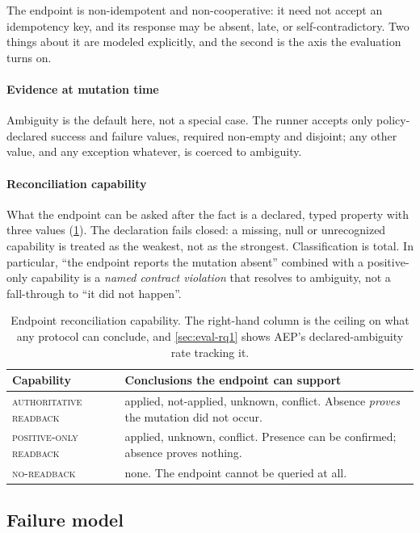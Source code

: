 The endpoint is non-idempotent and non-cooperative: it need not accept an
idempotency key, and its response may be absent, late, or self-contradictory.
Two things about it are modeled explicitly, and the second is the axis the
evaluation turns on.

\paragraph{Evidence at mutation time} Ambiguity is the default here, not a
special case. The runner accepts only policy-declared
success and failure values, required non-empty and disjoint; any other value,
and any exception whatever, is coerced to ambiguity.

\paragraph{Reconciliation capability} What the endpoint can be asked after the
fact is a declared, typed property with three values
(\cref{tab:capabilities}). The declaration fails closed: a missing, null or
unrecognized capability is treated as the weakest, not as the strongest.
Classification is total. In particular, ``the endpoint reports the mutation
absent'' combined with a positive-only capability is a \emph{named contract
violation} that resolves to ambiguity, not a fall-through to ``it did not
happen''.

\begin{table}[t]
\centering
\caption{Endpoint reconciliation capability. The right-hand column is the
ceiling on what any protocol can conclude, and \cref{sec:eval-rq1} shows
AEP's declared-ambiguity rate tracking it.}
\label{tab:capabilities}
\small
\begin{tabular}{@{}p{}p{}@{}}
\toprule
Capability & Conclusions the endpoint can support \\
\midrule
\textsc{authoritative} \textsc{readback} &
  applied, not-applied, unknown, conflict. Absence \emph{proves} the mutation
  did not occur. \\
\textsc{positive-only} \textsc{readback} &
  applied, unknown, conflict. Presence can be confirmed; absence proves
  nothing. \\
\textsc{no-readback} &
  none. The endpoint cannot be queried at all. \\
\bottomrule
\end{tabular}
\end{table}

\subsection{Failure model}

